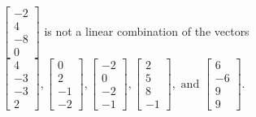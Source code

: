 \begin{exercise}
\begin{exerciseStatement}
  \end{exerciseStatement}
  \begin{exerciseAnswer}
   \(\left[\begin{array}{c}
-2 \\
4 \\
-8 \\
0
\end{array}\right]\) 
  	 is not  
	a linear combination of the vectors \(\left[\begin{array}{c}
4 \\
-3 \\
-3 \\
2
\end{array}\right] , \left[\begin{array}{c}
0 \\
2 \\
-1 \\
-2
\end{array}\right] , \left[\begin{array}{c}
-2 \\
0 \\
-2 \\
-1
\end{array}\right] , \left[\begin{array}{c}
2 \\
5 \\
8 \\
-1
\end{array}\right] , \text{ and } \left[\begin{array}{c}
6 \\
-6 \\
9 \\
9
\end{array}\right]\).

	
  


  \end{exerciseAnswer}
\end{exercise}